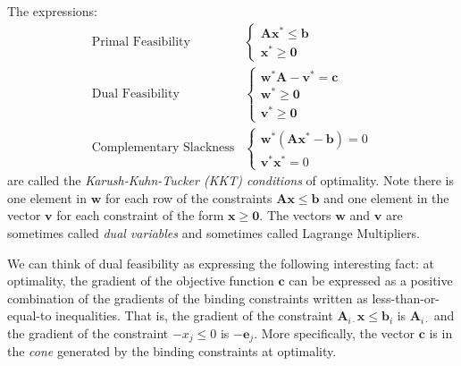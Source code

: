 \begin{remark} The expressions:
\begin{align}
\text{Primal Feasibility}&\left\{ 
\begin{aligned}
\mathbf{A}\mathbf{x}^* \leq \mathbf{b}\\
\mathbf{x}^* \geq \mathbf{0}
\end{aligned}\right.\\
\text{Dual Feasibility}&\left\{ 
\begin{aligned}
\mathbf{w}^*\mathbf{A} - \mathbf{v}^* = \mathbf{c}\\
\mathbf{w}^* \geq \mathbf{0}\\
\mathbf{v}^* \geq \mathbf{0}
\end{aligned}\right.\\
\text{Complementary Slackness}&\left\{ 
\begin{aligned}
\mathbf{w}^*\left(\mathbf{A}\mathbf{x}^* - \mathbf{b}\right) = 0\\
\mathbf{v}^*\mathbf{x}^* = 0
\end{aligned}\right.
\end{align}
are called the \textit{Karush-Kuhn-Tucker (KKT) conditions} of optimality. Note there is one element in $\mathbf{w}$ for each row of the constraints $\mathbf{A}\mathbf{x} \leq \mathbf{b}$ and one element in the vector $\mathbf{v}$ for each constraint of the form $\mathbf{x} \geq \mathbf{0}$. The vectors $\mathbf{w}$ and $\mathbf{v}$ are sometimes called \textit{dual variables} and sometimes called Lagrange Multipliers.

We can think of dual feasibility as expressing the following interesting fact: at optimality, the gradient of the objective function $\mathbf{c}$ can be expressed as a positive combination of the gradients of the binding constraints written as less-than-or-equal-to inequalities. That is, the gradient of the constraint $\mathbf{A}_{i\cdot}\mathbf{x} \leq \mathbf{b}_i$ is $\mathbf{A}_{i\cdot}$ and the gradient of the constraint $-{x}_j \leq 0$ is $-\mathbf{e}_j$. More specifically, the vector $\mathbf{c}$ is in the \textit{cone} generated by the binding constraints at optimality. 
\end{remark}

